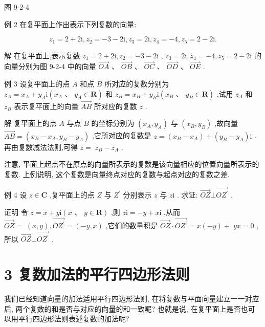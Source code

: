 \documentclass[10pt]{article}
\begin{document}
图 9-2-4

例 2 在复平面上作出表示下列复数的向量:

\[
{z}_{1} = 2 + 2\mathrm{i},{z}_{2} =  - 3 - 2\mathrm{i},{z}_{3} = 2\mathrm{i},{z}_{4} =  - 4,{z}_{5} = 2 - 2\mathrm{i}.
\]

解 在复平面上,表示复数 \({z}_{1} = 2 + 2\mathrm{i},{z}_{2} =  - 3 - 2\mathrm{i}\) , \({z}_{3} = 2\mathrm{i},{z}_{4} =  - 4,{z}_{5} = 2 - 2\mathrm{i}\) 的向量分别为图 9-2-4 中的向量 \(\overrightarrow{OA}\text{ 、 }\overrightarrow{OB}\text{ 、 }\overrightarrow{OC}\text{ 、 }\overrightarrow{OD}\text{ 、 }\overrightarrow{OE}\) .

例 3 设复平面上的点 \(A\) 和点 \(B\) 所对应的复数分别为 \({z}_{A} = {x}_{A} + {y}_{A}\mathrm{i}\left( {{x}_{A}\text{ 、 }{y}_{A} \in  \mathbf{R}}\right)\) 和 \({z}_{B} = {x}_{B} + {y}_{B}\mathrm{i}\left( {{x}_{B}\text{ 、 }{y}_{B} \in  \mathbf{R}}\right)\) ,试用 \({z}_{A}\) 和 \({z}_{B}\) 表示复平面上的向量 \(\overrightarrow{AB}\) 所对应的复数 \(z\) .

解 复平面上的点 \(A\) 与点 \(B\) 的坐标分别为 \(\left( {{x}_{A},{y}_{A}}\right)\) 与 \(\left( {{x}_{B},{y}_{B}}\right)\) ,故向量 \(\overrightarrow{AB} = \left( {{x}_{B} - {x}_{A},{y}_{B} - {y}_{A}}\right)\) ,它所对应的复数是 \(z = \left( {{x}_{B} - {x}_{A}}\right)  + \left( {{y}_{B} - {y}_{A}}\right) \mathrm{i}\) . 再由复数减法法则,可得 \(z = \; {z}_{B} - {z}_{A}\) .

注意, 平面上起点不在原点的向量所表示的复数是该向量相应的位置向量所表示的复数. 上例说明, 这个复数是向量终点对应的复数与起点对应的复数之差.

例 4 设 \(z \in  \mathbf{C}\) ,复平面上的点 \(Z\) 与 \({Z}^{\prime }\) 分别表示 \(z\) 与 \(z\mathrm{i}\) . 求证: \(\overrightarrow{OZ} \bot  \overrightarrow{O{Z}^{\prime }}\) .

证明 令 \(z = x + y\mathrm{i}\left( {x\text{ 、 }y \in  \mathbf{R}}\right)\) ,则 \(z\mathrm{i} =  - y + x\mathrm{i}\) ,从而 \(\overrightarrow{OZ} = \; \left( {x,y}\right) ,\overrightarrow{O{Z}^{\prime }} = \left( {-y,x}\right)\) ,它们的数量积是 \(\overrightarrow{OZ} \cdot  \overrightarrow{O{Z}^{\prime }} = x\left( {-y}\right)  + \; {yx} = 0\) ,所以 \(\overrightarrow{OZ} \bot  \overrightarrow{O{Z}^{\prime }}\) .

\section*{3 复数加法的平行四边形法则}

我们已经知道向量的加法适用平行四边形法则, 在将复数与平面向量建立一一对应后, 两个复数的和是否与对应的向量的和一致呢? 也就是说, 在复平面上是否也可以用平行四边形法则表述复数的加法呢?
\end{document}
